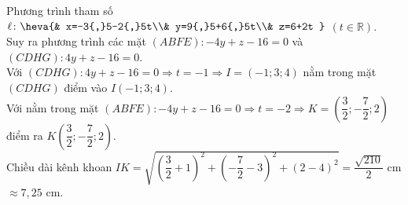 \begin{bt}
{		Phương trình tham số $\ell\colon \heva{& x=-3{,}5-2{,}5t\\& y=9{,}5+6{,}5t\\& z=6+2t }$ $\left( t\in\mathbb{R} \right)$.  \\
		Suy ra phương trình các  mặt $(ABFE)\colon -4y+z-16=0$ và $(CDHG)\colon 4y+z-16=0$.\\
		Với $(CDHG)\colon 4y+z-16=0\Rightarrow t=-1\Rightarrow I=\left( -1;3;4  \right)$ nằm trong mặt $(CDHG)$ điểm vào $I\left( -1;3;4 \right)$.\\
		Với nằm trong mặt $(ABFE)\colon -4y+z-16=0\Rightarrow t=-2\Rightarrow K=\left( \dfrac{3}{2};-\dfrac{7}{2};2 \right)$ điểm ra $K\left(  \dfrac{3}{2};-\dfrac{7}{2};2 \right)$.\\
		Chiều dài  kênh khoan $IK=\sqrt{\left( \dfrac{3}{2}+1 \right)^{2}+\left( -\dfrac{7}{2}-3 \right)^{2}+\left( 2-4 \right)^{2}}=\dfrac{\sqrt{210}}{2}$ cm $\approx 7{,}25$ cm.
	} 
\end{bt}

